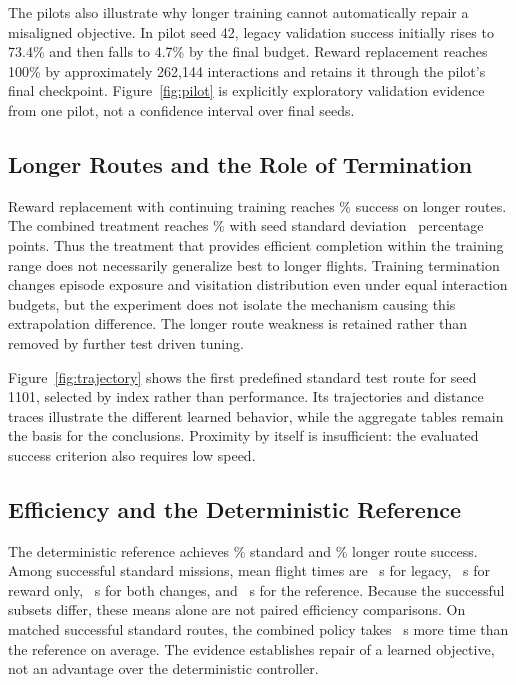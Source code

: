 \documentclass[conference]{IEEEtran}
\begin{document}
The pilots also illustrate why longer training cannot automatically repair a
misaligned objective. In pilot seed 42, legacy validation success initially
rises to 73.4\% and then falls to 4.7\% by the final budget. Reward replacement
reaches 100\% by approximately 262,144 interactions and retains it through
the pilot's final checkpoint. Figure~\ref{fig:pilot} is explicitly exploratory
validation evidence from one pilot, not a confidence interval over final seeds.

\subsection{Longer Routes and the Role of Termination}
Reward replacement with continuing training reaches \RewardOnlyLongSuccess\%
success on longer routes. The combined treatment reaches
\FixedLongSuccess\% with seed standard deviation \FixedLongSD\ percentage
points. Thus the treatment that provides efficient completion within the
training range does not necessarily generalize best to longer flights.
Training termination changes episode exposure and visitation distribution even
under equal interaction budgets, but the experiment does not isolate the
mechanism causing this extrapolation difference. The longer route weakness is
retained rather than removed by further test driven tuning.

Figure~\ref{fig:trajectory} shows the first predefined standard test route for
seed 1101, selected by index rather than performance. Its trajectories and
distance traces illustrate the different learned behavior, while the aggregate
tables remain the basis for the conclusions. Proximity by itself is insufficient:
the evaluated success criterion also requires low speed.

\subsection{Efficiency and the Deterministic Reference}
The deterministic reference achieves \PDSuccess\% standard and
\PDLongSuccess\% longer route success. Among successful standard missions,
mean flight times are \LegacyTime\ s for legacy, \RewardOnlyTime\ s for
reward only, \FixedTime\ s for both changes, and \PDTime\ s for the reference.
Because the successful subsets differ, these means alone are not paired
efficiency comparisons. On matched successful standard routes, the combined
policy takes \FixedMinusPDTime\ s more time than the reference on average.
The evidence establishes repair of a learned objective, not an advantage over
the deterministic controller.
\end{document}
